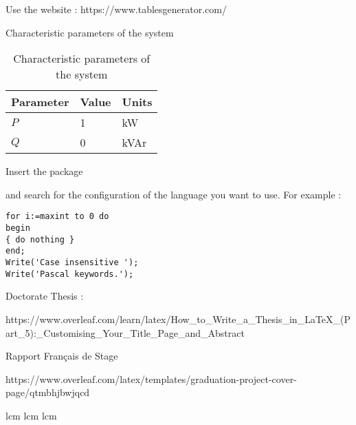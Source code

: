 
Use the website : https://www.tablesgenerator.com/

\begin{table}[tb]
	\centering
	\caption{Characteristic parameters of the system}
	\begin{tabular}{lll}
		Parameter & Value & Units\\
		\hline
		$P$ & 1 & kW \\
		$Q$ & 0 & kVAr\\
	    \hline
	\end{tabular}
	\caption{Characteristic parameters of the system}
	\label{tab:tab1}
\end{table}



Insert the package \usepackage{listings} and search for the configuration of the language you want to use. For example : 

\usepackage{listings} %

\begin{lstlisting}[caption=Source code for {\it hello.m},label=lst:code1,breaklines=true,basewidth=4pt,prebreak=**,postbreak=**,frame=single]
for i:=maxint to 0 do
begin
{ do nothing }
end;
Write('Case insensitive ');
Write('Pascal keywords.');
\end{lstlisting}
   


Doctorate Thesis : 

https://www.overleaf.com/learn/latex/How_to_Write_a_Thesis_in_LaTeX_(Part_5):_Customising_Your_Title_Page_and_Abstract

Rapport Français de Stage

https://www.overleaf.com/latex/templates/graduation-project-cover-page/qtmbhjbwjqcd

\acrshort{lcm}
\acrlong{lcm}
\acrfull{lcm}
